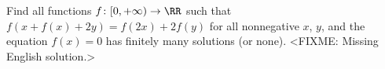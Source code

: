 \problem{}
Find all functions $f \colon [0, +\infty)\to \RR$ such that
$f(x + f(x) + 2 y) = f(2 x) + 2 f(y)$ for all nonnegative $x$, $y$, and the
equation $f(x) = 0$ has finitely many solutions (or none).
\solution
<FIXME: Missing English solution.>
\endproblem
